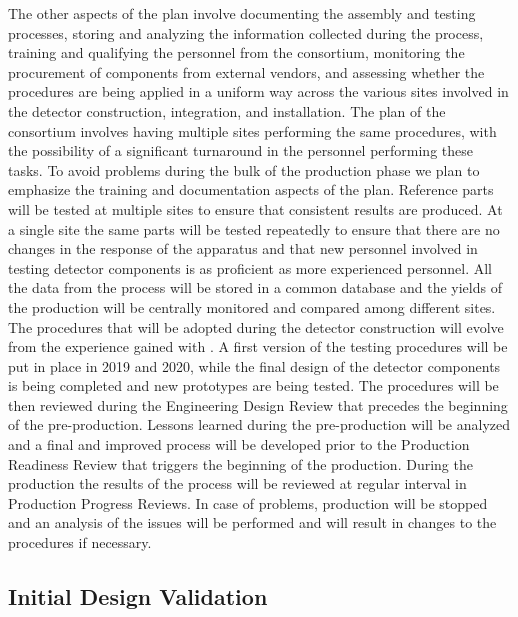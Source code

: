 The other aspects of the  plan involve documenting the 
assembly and testing processes, storing and analyzing the information
collected during the  process, training and qualifying the
personnel from the consortium, monitoring the procurement of 
components from external vendors, and assessing whether the
 procedures are being applied in a uniform way across
the various sites involved in the detector construction, integration,
and installation. The plan of the  consortium involves
having multiple sites performing the same  procedures,
with the possibility of a significant turnaround in the personnel
performing these tasks. To avoid problems during the bulk of the
production phase we plan to emphasize the training and documentation
aspects of the  plan. Reference parts will be tested at
multiple sites to ensure that consistent results are produced. At
a single site the same parts will be tested repeatedly to ensure
that there are no changes in the response of the apparatus and
that new personnel involved in testing detector components is 
as proficient as more experienced personnel. All the data from
the  process will be stored in a common database and
the yields of the production will be centrally monitored and 
compared among different sites. The procedures that will be adopted
during the detector construction will evolve from the experience
gained with . A first version of the testing procedures
will be put in place in 2019 and 2020, while the final design of
the detector components is being completed and new prototypes are
being tested. The  procedures will be then reviewed
during the Engineering Design Review that precedes the beginning
of the pre-production. Lessons learned during the pre-production
will be analyzed and a final and improved  process will be 
developed prior to the Production Readiness Review that triggers
the beginning of the production. During the production the results
of the  process will be reviewed at regular interval
in Production Progress Reviews. In case of problems, production
will be stopped and an analysis of the issues will be performed
and will result in changes to the procedures if necessary.

\subsection{Initial Design Validation}
\label{sec:fdsp-tpcelec-qa-initial}

